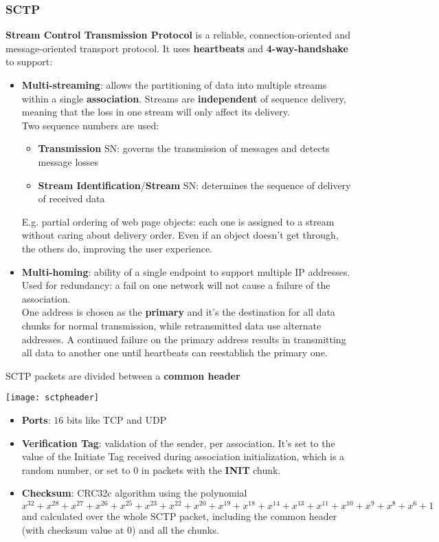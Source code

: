\subsubsection{SCTP}
\textbf{Stream Control Transmission Protocol} is a reliable, connection-oriented and message-oriented transport protocol. It uses \textbf{heartbeats} and \textbf{4-way-handshake} to support:
\begin{itemize}
	\item \textbf{Multi-streaming}: allows the partitioning of data into multiple streams within a single \textbf{association}. Streams are \textbf{independent} of sequence delivery, meaning that the loss in one stream will only affect its delivery.\\
	Two sequence numbers are used:
	\begin{itemize}
		\item \textbf{Transmission} SN: governs the transmission of messages and detects message losses
		\item \textbf{Stream Identification}/\textbf{Stream} SN: determines the sequence of delivery of received data
	\end{itemize}
	E.g. partial ordering of web page objects: each one is assigned to a stream without caring about delivery order. Even if an object doesn't get through, the others do, improving the user experience.
	\item \textbf{Multi-homing}: ability of a single endpoint to support multiple IP addresses. Used for redundancy: a fail on one network will not cause a failure of the association.\\
	One address is chosen as the \textbf{primary} and it's the destination for all data chunks for normal transmission, while retransmitted data use alternate addresses. A continued failure on the primary address results in transmitting all data to another one until heartbeats can reestablish the primary one.
\end{itemize}
SCTP packets are divided between a \textbf{common header}
\begin{center}
	\texttt{[image: sctpheader]}
\end{center}
\begin{itemize}
	\item \textbf{Ports}: $16$ bits like TCP and UDP
	\item \textbf{Verification Tag}: validation of the sender, per association. It's set to the value of the Initiate Tag received during association initialization, which is a random number, or set to $0$ in packets with the \textbf{INIT} chunk.
	\item \textbf{Checksum}: CRC32c algorithm using the polynomial
	\begin{equation*}
		x^{32}+x^{28}+x^{27}+x^{26}+x^{25}+x^{23}+x^{22}+x^{20}+x^{19}+x^{18}+x^{14}+x^{13}+x^{11}+x^{10}+x^9+x^8+x^6+1
	\end{equation*}
	and calculated over the whole SCTP packet, including the common header (with checksum value at $0$) and all the chunks.
\end{itemize}
